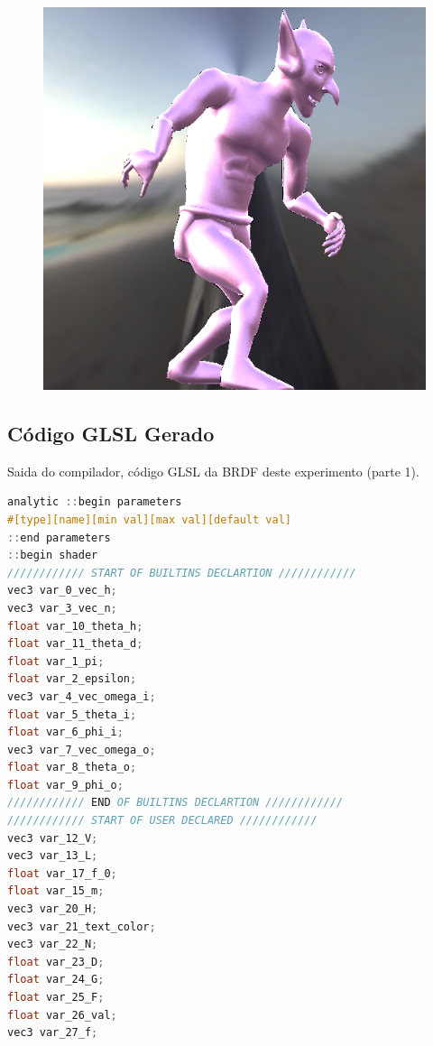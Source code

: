 \begin{figure}[H]
\endminipage\hfill
{}%
  \includegraphics[width=\linewidth]{./Imagens/brdfs/cook-torrance-alternative-goblin.png}
\endminipage
\end{figure}

\subsection{Código GLSL Gerado}
\begin{codigo}[H]
    \caption{\small Saida do compilador, código GLSL da BRDF deste experimento (parte 1). }
    \label{cod-cook-torrance-alternative-glsl-pt-1}
\begin{lstlisting}[language=C, inputencoding=utf8]
analytic ::begin parameters
#[type][name][min val][max val][default val]
::end parameters
::begin shader
//////////// START OF BUILTINS DECLARTION ////////////
vec3 var_0_vec_h;
vec3 var_3_vec_n;
float var_10_theta_h;
float var_11_theta_d;
float var_1_pi;
float var_2_epsilon;
vec3 var_4_vec_omega_i;
float var_5_theta_i;
float var_6_phi_i;
vec3 var_7_vec_omega_o;
float var_8_theta_o;
float var_9_phi_o;
//////////// END OF BUILTINS DECLARTION ////////////
//////////// START OF USER DECLARED ////////////
vec3 var_12_V;
vec3 var_13_L;
float var_17_f_0;
float var_15_m;
vec3 var_20_H;
vec3 var_21_text_color;
vec3 var_22_N;
float var_23_D;
float var_24_G;
float var_25_F;
float var_26_val;
vec3 var_27_f;
\end{lstlisting}
\end{codigo}

